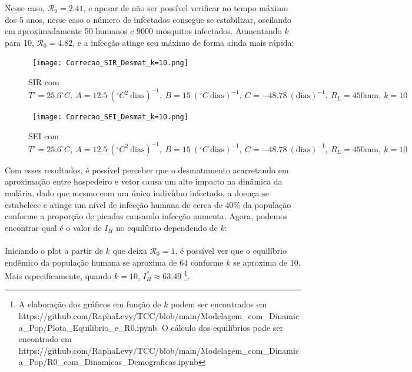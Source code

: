 \newpage
Nesse caso, $\mathcal{R}_0 = 2.41$, e apesar de não ser possível verificar no tempo 
máximo dos 5 anos, nesse caso o número de infectados consegue se estabilizar, 
oscilando em aproximadamente 50 humanos e 9000 mosquitos infectados. Aumentando $k$ para 10, 
$\mathcal{R}_0 = 4.82$, e a infecção atinge seu máximo de forma ainda mais rápida:
\begin{figure}[!ht]
        \centering
        \hbox{\hspace{4.2em} \texttt{[image: Correcao\_SIR\_Desmat\_k=10.png]}}
        \caption{SIR com $T'=25.6 ^\circ C, \ A=12.5 \ (^\circ C^2 \ \text{dias})^{-1}, \ B=15 \ (^\circ C \ \text{dias})^{-1}, \ C=-48.78 \ (\text{dias})^{-1}, \ R_L=450 \text{mm}, \ k=10$}
\end{figure} 
\begin{figure}[!ht]
        \centering
        \hbox{\hspace{4.2em} \texttt{[image: Correcao\_SEI\_Desmat\_k=10.png]}}
        \caption{SEI com $T'=25.6 ^\circ C, \ A=12.5 \ (^\circ C^2 \ \text{dias})^{-1}, \ B=15 \ (^\circ C \ \text{dias})^{-1}, \ C=-48.78 \ (\text{dias})^{-1}, \ R_L=450 \text{mm}, \ k=10$}
\end{figure} 
\newpage
Com esses resultados, é possível perceber que o desmatamento acarretando em aproximação
entre hospedeiro e vetor causa um alto impacto na dinâmica da malária,
dado que mesmo com um único indivíduo infectado, a doença se estabelece e atinge 
um nível de infecção humana de cerca de $40\%$ da população conforme a 
proporção de picadas causando infecção aumenta. Agora, podemos encontrar qual é o valor de $I_H$
no equilíbrio dependendo de $k$:
\\\\
Iniciando o plot a partir de $k$ que deixa $\mathcal{R}_0 = 1$, é possível ver que
o equilíbrio endêmico da população humana se aproxima de 64 conforme $k$ se aproxima de 10.
Mais especificamente, quando $k=10$, $I_H^* \approx 63.49$ \footnote{A elaboração 
dos gráficos em função de $k$ podem ser encontrados em https://github.com/RaphaLevy/TCC/blob/main/Modelagem\_com\_Dinamica\_Pop/Plota\_Equilibrio\_e\_R0.ipynb. 
O cálculo dos equilíbrios pode ser encontrado em
https://github.com/RaphaLevy/TCC/blob/main/Modelagem\_com\_Dinamica\_Pop/R0\_com\_Dinamicas\_Demograficas.ipynb}.
